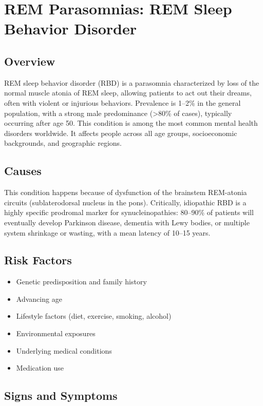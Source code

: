 \chapter{REM Parasomnias: REM Sleep Behavior Disorder}
\label{sec:REM Sleep Behavior Disorder}

\section{Overview}
REM sleep behavior disorder (RBD) is a parasomnia characterized by loss of the normal muscle atonia of REM sleep, allowing patients to act out their dreams, often with violent or injurious behaviors. Prevalence is 1--2\% in the general population, with a strong male predominance (>80\% of cases), typically occurring after age 50. This condition is among the most common mental health disorders worldwide. It affects people across all age groups, socioeconomic backgrounds, and geographic regions.
\section{Causes}
This condition happens because of dysfunction of the brainstem REM-atonia circuits (sublaterodorsal nucleus in the pons). Critically, idiopathic RBD is a highly specific prodromal marker for synucleinopathies: 80--90\% of patients will eventually develop Parkinson disease, dementia with Lewy bodies, or multiple system shrinkage or wasting, with a mean latency of 10--15 years.     
\section{Risk Factors}

\begin{itemize}[noitemsep]
  \item Genetic predisposition and family history
  \item Advancing age
  \item Lifestyle factors (diet, exercise, smoking, alcohol)
  \item Environmental exposures
  \item Underlying medical conditions
  \item Medication use
\end{itemize}
\section{Signs and Symptoms}

